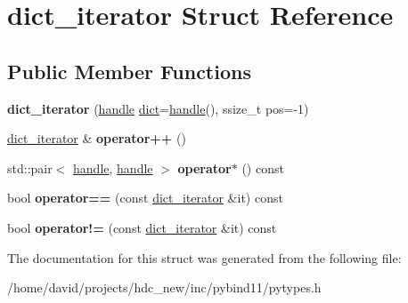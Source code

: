 \hypertarget{structdict__iterator}{}\section{dict\+\_\+iterator Struct Reference}
\label{structdict__iterator}
\subsection*{Public Member Functions}
\begin{DoxyCompactItemize}
\item 
{\bfseries dict\+\_\+iterator} (\hyperlink{classhandle}{handle} \hyperlink{classdict}{dict}=\hyperlink{classhandle}{handle}(), ssize\+\_\+t pos=-\/1)\hypertarget{structdict__iterator_a17aa5a1c474f3af33f594416b11771c0}{}\label{structdict__iterator_a17aa5a1c474f3af33f594416b11771c0}

\item 
\hyperlink{structdict__iterator}{dict\+\_\+iterator} \& {\bfseries operator++} ()\hypertarget{structdict__iterator_a6341a24f2690ca3b8d7e6d6f37acc50d}{}\label{structdict__iterator_a6341a24f2690ca3b8d7e6d6f37acc50d}

\item 
std\+::pair$<$ \hyperlink{classhandle}{handle}, \hyperlink{classhandle}{handle} $>$ {\bfseries operator$\ast$} () const \hypertarget{structdict__iterator_aeaad088e1a63525faf1f9ed51f2f37d0}{}\label{structdict__iterator_aeaad088e1a63525faf1f9ed51f2f37d0}

\item 
bool {\bfseries operator==} (const \hyperlink{structdict__iterator}{dict\+\_\+iterator} \&it) const \hypertarget{structdict__iterator_ab01e756fd3601e892b62a56abbb05950}{}\label{structdict__iterator_ab01e756fd3601e892b62a56abbb05950}

\item 
bool {\bfseries operator!=} (const \hyperlink{structdict__iterator}{dict\+\_\+iterator} \&it) const \hypertarget{structdict__iterator_a8feb4381c802b87d83791ca7be52733c}{}\label{structdict__iterator_a8feb4381c802b87d83791ca7be52733c}

\end{DoxyCompactItemize}


The documentation for this struct was generated from the following file\+:\begin{DoxyCompactItemize}
\item 
/home/david/projects/hdc\+\_\+new/inc/pybind11/pytypes.\+h\end{DoxyCompactItemize}
